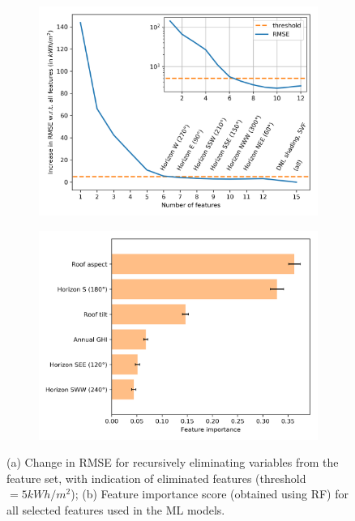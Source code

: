 \begin{figure}[tb]
\centering
\begin{subfigure}{.49\textwidth}
  \centering
  \includegraphics[width=\linewidth]{images/Figs/ftr_selection_topdown_reduced_run1_w_excluded.png}
  \subcaption{}
  \label{fig:chile_RFE}
\end{subfigure}
\begin{subfigure}{.49\textwidth}
  \centering
  \includegraphics[width=\linewidth]{images/Figs/Feature_importance_selFtrs_mean_10k.png}  
  \subcaption{}
    \label{fig:chile_FtrImp}
\end{subfigure}
\caption{(a) Change in RMSE for recursively eliminating variables from the feature set, with indication of eliminated features (threshold $= 5 kWh/m^2$); (b) Feature importance score (obtained using RF) for all selected features used in the ML models.}
\label{fig:chile_ftrs}
\end{figure}


